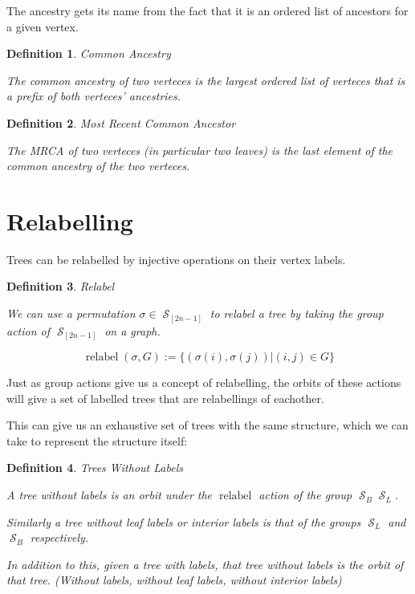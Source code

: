 \documentclass[10pt,a4paper]{report}
\DeclareMathOperator{\relabel}{relabel}
\DeclareMathOperator{\S}{\mathcal{S}}
\newtheorem{definition}{Definition}
\begin{document}
The ancestry gets its name from the fact that it is an ordered list of
ancestors for a given vertex.

\begin{definition} Common Ancestry

	The common ancestry of two verteces is the largest ordered list of verteces
	that is a prefix of both verteces' ancestries.
\end{definition}

\begin{definition} Most Recent Common Ancestor

	The MRCA of two verteces (in particular two leaves) is the last element of
	the common ancestry of the two verteces.
\end{definition}

\section{Relabelling}

Trees can be relabelled by injective operations on their vertex labels.

\begin{definition} Relabel

	We can use a permutation $\sigma \in \S_[2n-1]$ to relabel a tree by taking
	the group action of $\S_[2n-1]$ on a graph.

	\[
		\relabel(\sigma, G) := \{(\sigma(i), \sigma(j)) | (i, j) \in G\}
	\]
\end{definition}

Just as group actions give us a concept of relabelling, the orbits of these
actions will give a set of labelled trees that are relabellings of eachother.

This can give us an exhaustive set of trees with the same structure, which we
can take to represent the structure itself:

\begin{definition} Trees Without Labels

	A tree without labels is an orbit under the $\relabel$ action of the group ${\S_B}{\S_L}$.

	Similarly a tree without leaf labels or interior labels is that of the groups $\S_L$ and $\S_B$ respectively.

	In addition to this, given a tree with labels, \emph{that} tree without labels is the orbit of that tree. (Without labels, without leaf labels, without interior labels)
\end{definition}
\end{document}
